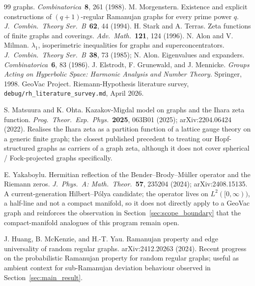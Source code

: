 \documentclass[11pt]{article}
\begin{document}
\begin{thebibliography}{99}
graphs.  \emph{Combinatorica}\ \textbf{8}, 261 (1988).
 M. Morgenstern.  Existence and explicit
constructions of $(q+1)$-regular Ramanujan graphs for every prime
power $q$.  \emph{J.\ Combin.\ Theory Ser.\ B}\ \textbf{62}, 44 (1994).
 H. Stark and A. Terras.  Zeta functions of finite
graphs and coverings.  \emph{Adv.\ Math.}\ \textbf{121}, 124 (1996).
 N. Alon and V. Milman.  $\lambda_1$, isoperimetric
inequalities for graphs and superconcentrators.  \emph{J.\ Combin.\
Theory Ser.\ B}\ \textbf{38}, 73 (1985); N. Alon.  Eigenvalues and
expanders.  \emph{Combinatorica}\ \textbf{6}, 83 (1986).
 J. Elstrodt, F. Grunewald, and J. Mennicke.
\emph{Groups Acting on Hyperbolic Space: Harmonic Analysis and Number
Theory.}  Springer, 1998.
 GeoVac Project.  Riemann-Hypothesis literature
survey, \texttt{debug/rh\_literature\_survey.md}, April 2026.

 S. Matsuura and K. Ohta.  Kazakov-Migdal model
on graphs and the Ihara zeta function.  \emph{Prog.\ Theor.\ Exp.\
Phys.}\ \textbf{2025}, 063B01 (2025);
arXiv:2204.06424 (2022).  Realises the Ihara zeta as a partition
function of a lattice gauge theory on a generic finite graph; the
closest published precedent to treating our Hopf-structured graphs
as carriers of a graph zeta, although it does not cover spherical /
Fock-projected graphs specifically.

 E. Yakaboylu.  Hermitian reflection of the
Bender--Brody--M\"uller operator and the Riemann zeros.
\emph{J.\ Phys.\ A: Math.\ Theor.}\ \textbf{57}, 235204 (2024);
arXiv:2408.15135.  A current-generation Hilbert--P\'olya candidate;
the operator lives on $L^2([0,\infty))$, a half-line and not a
compact manifold, so it does not directly apply to a GeoVac graph
and reinforces the observation in Section~\ref{sec:scope_boundary}
that the compact-manifold analogues of this program remain open.

\bibitem{hmy2024} J. Huang, B. McKenzie, and H.-T. Yau.  Ramanujan
property and edge universality of random regular graphs.
arXiv:2412.20263 (2024).  Recent progress on the probabilistic
Ramanujan property for random regular graphs; useful as ambient
context for sub-Ramanujan deviation behaviour observed in
Section~\ref{sec:main_result}.

\end{thebibliography}
\end{document}

